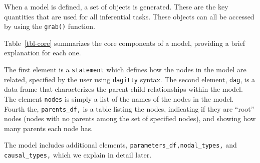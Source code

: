 \documentclass[
  11pt,
  article]{jss}
\begin{document}
When a model is defined, a set of objects is generated. These are the
key quantities that are used for all inferential tasks. These objects
can all be accessed by using the \texttt{grab()} function.

Table~\ref{tbl-core} summarizes the core components of a model,
providing a brief explanation for each one.

The first element is a \texttt{statement} which defines how the nodes in
the model are related, specified by the user using \texttt{dagitty}
syntax. The second element, \texttt{dag}, is a data frame that
characterizes the parent-child relationships within the model. The
element \texttt{nodes} is simply a list of the names of the nodes in the
model. Fourth the, \texttt{parents\_df,} is a table listing the nodes,
indicating if they are ``root'' nodes (nodes with no parents among the
set of specified nodes), and showing how many parents each node has.

The model includes additional elements,
\texttt{parameters\_df,\textasciigrave{}\textasciigrave{}nodal\_types,}
and \texttt{causal\_types,} which we explain in detail later.
\end{document}
